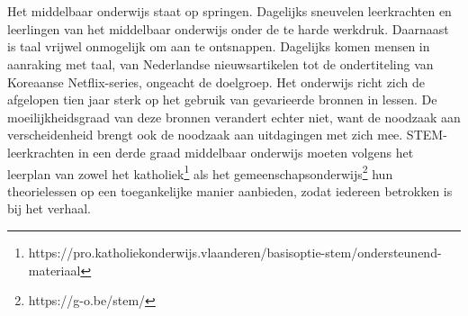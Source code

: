
\chapter{}%
\label{ch:inleiding}



Het middelbaar onderwijs staat op springen. Dagelijks sneuvelen leerkrachten en leerlingen van het middelbaar onderwijs onder de te harde werkdruk. Daarnaast is taal vrijwel onmogelijk om aan te ontsnappen. Dagelijks komen mensen in aanraking met taal, van Nederlandse nieuwsartikelen tot de ondertiteling van Koreaanse Netflix-series, ongeacht de doelgroep. Het onderwijs richt zich de afgelopen tien jaar sterk op het gebruik van gevarieerde bronnen in lessen. De moeilijkheidsgraad van deze bronnen verandert echter niet, want de noodzaak aan verscheidenheid brengt ook de noodzaak aan uitdagingen met zich mee. STEM-leerkrachten in een derde graad middelbaar onderwijs moeten volgens het leerplan van zowel het katholiek\footnote{https://pro.katholiekonderwijs.vlaanderen/basisoptie-stem/ondersteunend-materiaal} als het gemeenschapsonderwijs\footnote{https://g-o.be/stem/} hun theorielessen op een toegankelijke manier aanbieden, zodat iedereen betrokken is bij het verhaal.

